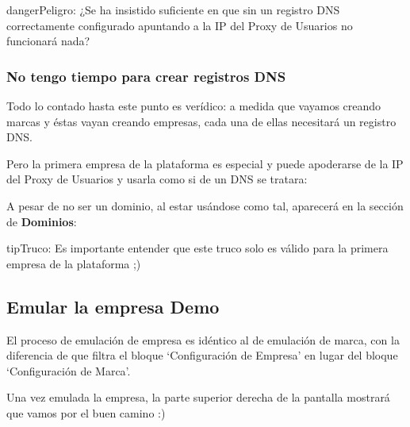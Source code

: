 \documentclass[letterpaper,10pt,spanish]{sphinxmanual}
\begin{document}
\begin{notice}{danger}{Peligro:}
¿Se ha insistido suficiente en que sin un registro DNS correctamente configurado apuntando a la IP del Proxy de Usuarios no funcionará nada?
\end{notice}


\subsubsection{No tengo tiempo para crear registros DNS}
\label{internal_calls/brand_portal:dnshack}\label{internal_calls/brand_portal:no-tengo-tiempo-para-crear-registros-dns}
Todo lo contado hasta este punto es verídico: a medida que vayamos creando marcas y éstas vayan creando empresas, cada una de ellas necesitará un registro DNS.

Pero la primera empresa de la plataforma es especial y puede apoderarse de la IP del Proxy de Usuarios y usarla como si de un DNS se tratara:

\noindent{}

A pesar de no ser un dominio, al estar usándose como tal, aparecerá en la sección de \textbf{Dominios}:

\noindent{}

\begin{notice}{tip}{Truco:}
Es importante entender que este truco solo es válido para la primera empresa de la plataforma ;)
\end{notice}


\subsection{Emular la empresa Demo}
\label{internal_calls/brand_portal:emular-la-empresa-demo}\label{internal_calls/brand_portal:emulate-company}
El proceso de emulación de empresa es idéntico al de emulación de marca, con la diferencia de que filtra el bloque `Configuración de Empresa' en lugar del bloque `Configuración de Marca'.



Una vez emulada la empresa, la parte superior derecha de la pantalla mostrará que vamos por el buen camino :)
\end{document}
